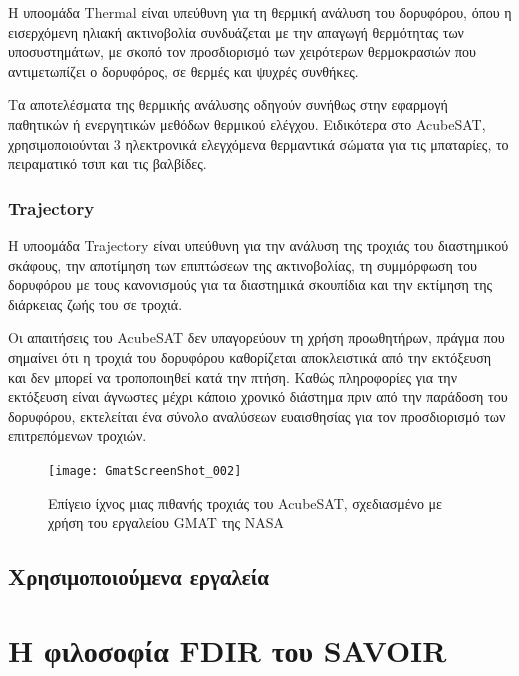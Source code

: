 \documentclass[a4paper,nobib]{tufte-book}
\begin{document}
Η υποομάδα Thermal είναι υπεύθυνη για τη θερμική ανάλυση του δορυφόρου, όπου η εισερχόμενη ηλιακή ακτινοβολία συνδυάζεται με την απαγωγή θερμότητας των υποσυστημάτων, με σκοπό τον προσδιορισμό των χειρότερων θερμοκρασιών που αντιμετωπίζει ο δορυφόρος, σε θερμές και ψυχρές συνθήκες.

Τα αποτελέσματα της θερμικής ανάλυσης οδηγούν συνήθως στην εφαρμογή παθητικών ή ενεργητικών μεθόδων θερμικού ελέγχου. Ειδικότερα στο AcubeSAT, χρησιμοποιούνται 3 ηλεκτρονικά ελεγχόμενα θερμαντικά σώματα για τις μπαταρίες, το πειραματικό τσιπ και τις βαλβίδες.

\subsection{Trajectory}

Η υποομάδα Trajectory είναι υπεύθυνη για την ανάλυση της τροχιάς του διαστημικού σκάφους, την αποτίμηση των επιπτώσεων της ακτινοβολίας, τη συμμόρφωση του δορυφόρου με τους κανονισμούς για τα διαστημικά σκουπίδια και την εκτίμηση της διάρκειας ζωής του σε τροχιά.

Οι απαιτήσεις του AcubeSAT δεν υπαγορεύουν τη χρήση προωθητήρων, πράγμα που σημαίνει ότι η τροχιά του δορυφόρου καθορίζεται αποκλειστικά από την εκτόξευση και δεν μπορεί να τροποποιηθεί κατά την πτήση. Καθώς πληροφορίες για την εκτόξευση είναι άγνωστες μέχρι κάποιο χρονικό διάστημα πριν από την παράδοση του δορυφόρου, εκτελείται ένα σύνολο αναλύσεων ευαισθησίας για τον προσδιορισμό των επιτρεπόμενων τροχιών. \autocite{MDO,retselis_acubesat_fmea_2020}
\begin{figure}
	\texttt{[image: GmatScreenShot\_002]}
	\caption[Επίγειο ίχνος μιας πιθανής τροχιάς του AcubeSAT]{Επίγειο ίχνος μιας πιθανής τροχιάς του AcubeSAT, σχεδιασμένο με χρήση του εργαλείου \acl{GMAT} της NASA}
	\label{fig:gmat}
\end{figure}


\section{Χρησιμοποιούμενα εργαλεία}

\chapter{Η φιλοσοφία \ac{FDIR} του SAVOIR}
\end{document}
